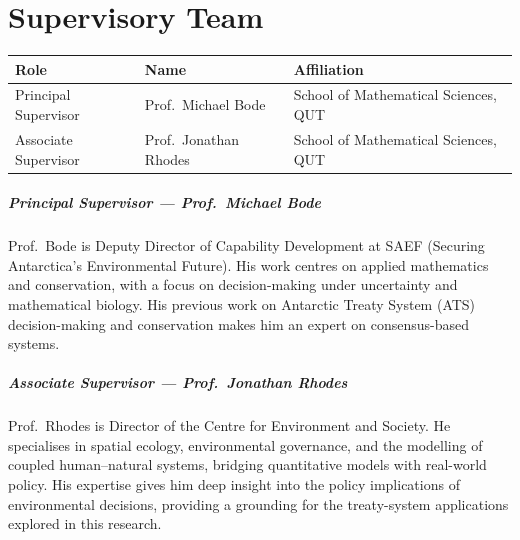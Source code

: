 \chapter*{Supervisory Team}

\begin{tabular}{@{}lll@{}}
  \toprule
  \textbf{Role}                & \textbf{Name}              & \textbf{Affiliation} \\
  \midrule
  Principal Supervisor         & Prof.\ Michael Bode        & School of Mathematical Sciences, QUT \\[4pt]
  Associate Supervisor         & Prof.\ Jonathan Rhodes     & School of Mathematical Sciences, QUT \\
  \bottomrule
\end{tabular}

\vspace{1.5em}

\paragraph{Principal Supervisor — Prof.\ Michael Bode}
Prof.\ Bode is Deputy Director of Capability Development at SAEF (Securing Antarctica's
 Environmental Future). His work centres on applied mathematics and conservation, with 
 a focus on decision-making under uncertainty and mathematical biology. His previous work
on Antarctic Treaty System (ATS) decision-making and conservation makes him an expert
on consensus-based systems. 

\paragraph{Associate Supervisor — Prof.\ Jonathan Rhodes}
Prof.\ Rhodes is Director of the Centre for Environment and Society. He specialises in
spatial ecology, environmental governance, and the modelling of coupled human–natural
systems, bridging quantitative models with real-world policy. His expertise gives him
deep insight into the policy implications of environmental decisions, providing a
grounding for the treaty-system applications explored in this research.
